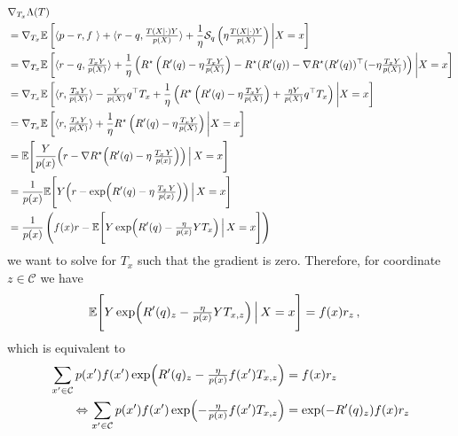 \documentclass{article}
\theoremstyle{plain}
\theoremstyle{definition}
\theoremstyle{remark}
\newcommand{\E}{\mathbb E}
\newcommand{\cS}{\mathcal S}
\newcommand{\cC}{\mathcal C}
\theoremstyle{definition}
\begin{document}
\begin{align*}
     & \nabla_{T_x}
    \Lambda(T)      \\
     & =
    \nabla_{T_x}
    \E\left[
        \langle p - r, f \
        \rangle
        + \langle r - q, \tfrac{T(X|\cdot) Y}{p(X)} \rangle
        + \frac{1}{\eta} \cS_q\left(\eta \tfrac{T(X|\cdot) Y}{p(X)}\right)
        \bigg| X = x
        \right]
    \\
     & =
    \nabla_{T_x}
    \E\left[
        \langle r - q, \tfrac{T_x Y}{p(X)} \rangle
        + \frac{1}{\eta} \left(
        R^\star\left(R'(q) - \eta \tfrac{T_x Y}{p(X)}\right)
        - R^\star(R'(q))
        - \nabla R^\star(R'(q))^\top (- \eta \tfrac{T_x Y}{p(X)})
        \right)
        \bigg| X = x
        \right]
    \\
     & =
    \nabla_{T_x}
    \E\left[
        \langle r, \tfrac{T_x Y}{p(X)} \rangle
        -
        \tfrac{Y}{p(X)} q^\top T_x
        + \frac{1}{\eta} \left(
        R^\star\left(R'(q) - \eta \tfrac{T_x Y}{p(X)}\right)
        + \tfrac{\eta Y}{p(X)} q^\top T_x
        \right)
        \bigg| X = x
        \right]
    \\
     & =
    \nabla_{T_x}
    \E\left[
        \langle r, \tfrac{T_x Y}{p(X)} \rangle
        + \frac{1}{\eta}
        R^\star\left(R'(q) - \eta \tfrac{T_x Y}{p(X)}\right)
        \bigg| X = x
        \right]
    \\
     & =
    \E\Biggl[
        \frac{Y}{p(x)}
        \Bigl(
        r - \nabla R^\star\Bigl(R'(q)-\eta\,\tfrac{T_x\,Y}{p(x)}\Bigr)
        \Bigr)
        \,\Big|\, X = x
        \Biggr]
    \\
     & =
    \frac{1}{p(x)}
    \E\Biggl[
        Y \Bigl(
        r - \exp\Bigl(R'(q)-\eta\,\tfrac{T_x\,Y}{p(x)}\Bigr)
        \Bigr)
        \,\Big|\, X = x
        \Biggr]
    \\
     & =
    \frac{1}{p(x)}
    \left(
    f(x)r -
    \E\Biggl[
        Y
        \exp\Bigl(R'(q)- \tfrac{\eta}{p(x)} Y T_x\Bigr)
        \,\Big|\, X = x
        \Biggr]
    \right)
\end{align*}
we want to solve for $T_x$ such that the gradient is zero.
Therefore, for coordinate $z \in \cC$ we have
\begin{align*}
    \E\Biggl[
        Y
        \exp\Bigl(R'(q)_z - \tfrac{\eta}{p(x)} Y T_{x,z}\Bigr)
        \,\Big|\, X = x
        \Biggr]
     & =
    f(x)r_z \,,
\end{align*}
which is equivalent to
\begin{align*}
    \sum_{x' \in \cC}
    p(x')
    f(x')
    \exp\Bigl(R'(q)_z - \tfrac{\eta}{p(x)} f(x') T_{x,z}\Bigr)
     & =
    f(x)r_z               \\
    \Leftrightarrow
    \sum_{x' \in \cC}
    p(x')
    f(x')
    \exp\Bigl(-\tfrac{\eta}{p(x)} f(x') T_{x,z}\Bigr)
     & =
    \exp(-R'(q)_z)f(x)r_z \\
\end{align*}





\end{document}

